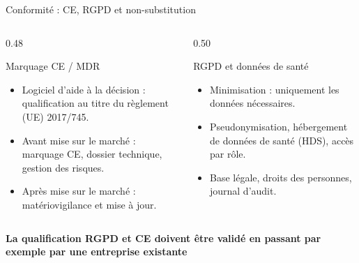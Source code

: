 \begin{frame}{Conformité : CE, RGPD et non-substitution}
  \scriptsize
  \begin{columns}[T,onlytextwidth]
    \begin{column}{0.48\textwidth}
      \begin{block}{Marquage CE / MDR}
        \begin{itemize}
          \item Logiciel d'aide à la décision : qualification au titre du
            règlement (UE) 2017/745.
          \item Avant mise sur le marché : marquage CE, dossier technique,
            gestion des risques.
          \item Après mise sur le marché : matériovigilance et mise à jour.
        \end{itemize}
      \end{block}
    \end{column}

    \begin{column}{0.50\textwidth}
      \begin{alertblock}{RGPD et données de santé}
        \begin{itemize}
          \item Minimisation : uniquement les données nécessaires.
          \item Pseudonymisation, hébergement de données de santé (HDS),
            accès par rôle.
          \item Base légale, droits des personnes, journal d'audit.
        \end{itemize}
      \end{alertblock}
    \end{column}
  \end{columns}

\vspace{1cm}
 \textbf{La qualification RGPD et CE doivent être validé en passant par exemple par une entreprise
 	existante}
\end{frame}
